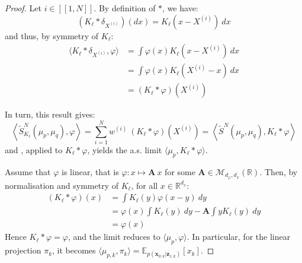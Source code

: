 \begin{proof}
	Let $i\in[\![1,N]\!]$. By definition of $*$, we have:
	\begin{equation}
		(K_\ell*\delta_{X^{(i)}})(dx)=K_\ell(x-X^{(i)})\:dx
	\end{equation}
	and thus, by symmetry of $K_\ell$:
	\begin{equation}
		\begin{aligned}
		\langle K_\ell*\delta_{X^{(i)}},\varphi\rangle&=\int{\varphi(x)K_\ell(x-X^{(i)})\:dx}\\
		&=\int{\varphi(x)K_\ell(X^{(i)}-x)\:dx}\\
		&=(K_\ell*\varphi)(X^{(i)})
		\end{aligned}
	\end{equation}

	In turn, this result gives:
	\begin{equation}
		\left\langle\tilde{S}_{K_\ell}^N(\mu_p,\mu_q),\varphi\right\rangle=\sum_{i=1}^Nw^{(i)}\:(K_\ell*\varphi)\left(X^{(i)}\right)=\left\langle\tilde{S}^N(\mu_p,\mu_q),K_\ell*\varphi\right\rangle
	\end{equation}
	and , applied to $K_\ell*\varphi$, yields the a.s. limit $\langle\mu_p,K_\ell*\varphi\rangle$.

	Assume that $\varphi$ is linear, that is $\varphi:x\mapsto \mathbf{A}\:x$ for some $\mathbf{A}\in\mathcal{M}_{d_{\varphi},d_x}(\mathbb{R})$. Then, by normalisation and symmetry of $K_\ell$, for all $x\in\mathbb{R}^{d_x}$:
	\begin{equation}
		\begin{aligned}
		(K_\ell*\varphi)(x)&=\int{K_\ell(y)\varphi(x-y)\:dy}\\
		&=\varphi(x)\int{K_\ell(y)\:dy}-\mathbf{A}\int{yK_\ell(y)\:dy}\\
		&=\varphi(x)
		\end{aligned}
	\end{equation}
	Hence $K_\ell*\varphi=\varphi$, and the limit reduces to $\langle\mu_p,\varphi\rangle$. In particular, for the linear projection $\pi_k$, it becomes $\langle\mu_{p,k},\pi_k\rangle=\mathbb{E}_{p(\mathbf{x}_{0:k}|\mathbf{z}_{1:k})}[x_k]$.
\end{proof}

